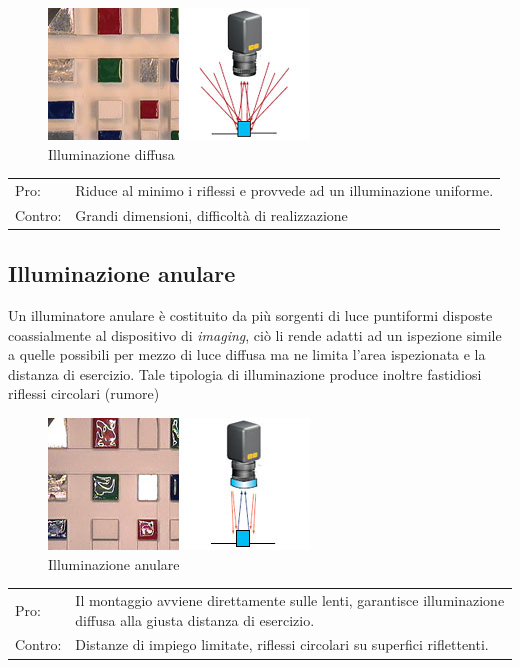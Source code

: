\begin{figure}
\centering
\includegraphics[width=.3\textwidth]{img/illuminazione-diffusa.jpg}
\caption{Illuminazione diffusa}\label{fig:illuminazione-diffusa}
\end{figure}


\begin{centering}
\centering
\begin{tabular}{l l}
Pro: &  Riduce al minimo i riflessi e provvede ad un illuminazione uniforme. \\
Contro: &  Grandi dimensioni, difficoltà di realizzazione \\
\end{tabular}
\end{centering}

\subsection{Illuminazione anulare}
Un illuminatore anulare è costituito da più sorgenti di luce 
puntiformi disposte coassialmente al dispositivo di 
\emph{imaging}, ciò li rende adatti ad un ispezione simile a quelle 
possibili per mezzo di luce diffusa ma ne limita l'area 
ispezionata e la distanza di esercizio. Tale tipologia di 
illuminazione produce inoltre fastidiosi riflessi circolari 
(rumore) 
 


\begin{figure}[h]
\centering
\includegraphics[width=.3\textwidth]{img/illuminazione-anulare.jpg}
\caption{Illuminazione anulare}\label{fig:illuminazione-anulare}
\end{figure}

\begin{centering}
\centering
\begin{tabularx}{\textwidth}{l p{}}
Pro: &  Il montaggio avviene direttamente sulle lenti, garantisce illuminazione diffusa alla giusta distanza di esercizio. \\
Contro: &  Distanze di impiego limitate, riflessi circolari su superfici riflettenti.\\
\end{tabularx}
\end{centering}

